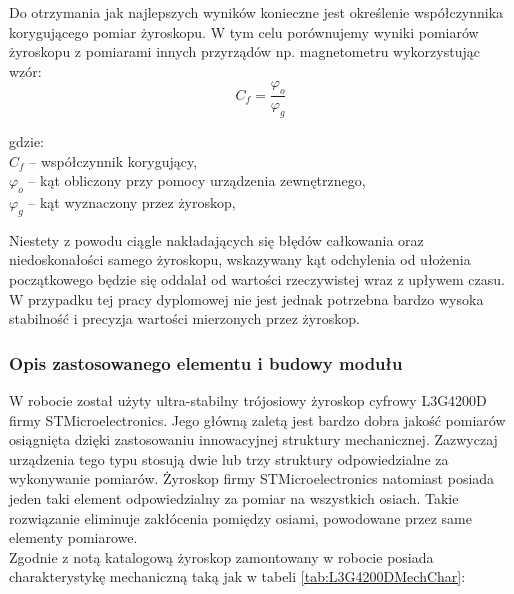 Do otrzymania jak najlepszych wyników konieczne jest określenie współczynnika korygującego pomiar żyroskopu.
W tym celu porównujemy wyniki pomiarów żyroskopu z pomiarami innych przyrządów np. magnetometru wykorzystując wzór:
\begin{equation}
  C_{f} = \frac{\varphi_{o}}{\varphi_{g}}
\end{equation}
\begin{tabbing}
  gdzie: \= \\
    \> $C_{f}$ -- współczynnik korygujący, \\
    \> $\varphi_{o}$ -- kąt obliczony przy pomocy urządzenia zewnętrznego,\\
    \> $\varphi_{g}$ -- kąt wyznaczony przez żyroskop,\\
\end{tabbing}

Niestety z powodu ciągle nakładających się błędów całkowania oraz niedoskonałości samego żyroskopu, wskazywany kąt odchylenia od ułożenia początkowego będzie się oddalał od wartości rzeczywistej wraz z upływem czasu. W przypadku tej pracy dyplomowej nie jest jednak potrzebna bardzo wysoka stabilność i precyzja wartości mierzonych przez żyroskop.

\subsubsection{Opis zastosowanego elementu i budowy modułu}
W robocie został użyty ultra-stabilny trójosiowy żyroskop cyfrowy L3G4200D firmy STMicroelectronics. Jego główną zaletą jest bardzo dobra jakość pomiarów osiągnięta dzięki zastosowaniu innowacyjnej struktury mechanicznej. Zazwyczaj urządzenia tego typu stosują dwie lub trzy struktury odpowiedzialne za wykonywanie pomiarów. Żyroskop firmy STMicroelectronics natomiast posiada jeden taki element odpowiedzialny za pomiar na wszystkich osiach. Takie rozwiązanie eliminuje zakłócenia pomiędzy osiami, powodowane przez same elementy pomiarowe.
\\

Zgodnie z notą katalogową\cite{L3G4200DDataSheet} żyroskop zamontowany w robocie posiada charakterystykę mechaniczną taką jak w tabeli \ref{tab:L3G4200DMechChar}:

